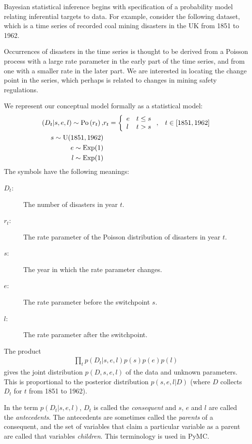 \documentclass[]{book}
\begin{document}
Bayesian statistical inference begins with specification of a probability model relating inferential targets to data. For example, consider the following dataset, which is a time series of recorded coal mining disasters in the UK from 1851 to 1962.
\begin{center}
\end{center}
Occurrences of disasters in the time series is thought to be derived from a Poisson process with a large rate parameter in the early part of the time series, and from one with a smaller rate in the later part. We are interested in locating the change point in the series, which perhaps is related to changes in mining safety regulations.

We represent our conceptual model formally as a statistical model:
\begin{eqnarray*}
(D_t | s, e, l) \sim \textup{Po}\left(r_t\right), & r_t=\left\{\begin{array}{ll}
    e & t\le s\\ l & t>s
    \end{array}\right.,&t\in[1851,1962]\\
s\sim \textup{U}(1851, 1962)\\
e\sim \textup{Exp}(1)\\
l\sim \textup{Exp}(1)
\end{eqnarray*}
The symbols have the following meanings:
\begin{description}
    \item[$D_t$:] The number of disasters in year $t$.
    \item[$r_t$:] The rate parameter of the Poisson distribution of disasters in year $t$.
    \item[$s$:] The year in which the rate parameter changes.
    \item[$e$:] The rate parameter before the switchpoint $s$.
    \item[$l$:] The rate parameter after the switchpoint.
\end{description}

The product
\begin{eqnarray*}
\prod_t p(D_t|s,e,l) p(s)p(e)p(l)
\end{eqnarray*}
gives the joint distribution $p(D,s,e,l)$ of the data and unknown parameters. This is proportional to the posterior distribution $p(s,e,l|D)$ (where $D$ collects $D_t$ for $t$ from 1851 to 1962).

In the term $p(D_t|s,e,l)$, $D_t$ is called the \emph{consequent} and $s$, $e$ and $l$ are called the \emph{antecedents}. The antecedents are sometimes called the \emph{parents} of a consequent, and the set of variables that claim a particular variable as a parent are called that variables \emph{children}. This terminology is used in PyMC.
\end{document}

